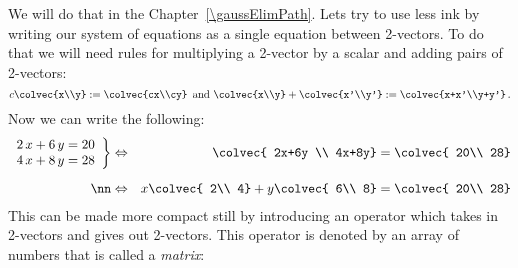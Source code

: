 %
We will do that in the Chapter~\ref{\gaussElimPath}. Lets try to use less ink by writing our system of  equations as a single equation between 2-vectors.
To do that we will need rules for multiplying a 2-vector by a scalar and adding pairs of 2-vectors:
$$
c\colvec{x\\y}:=\colvec{cx\\cy}\, \mbox{ and } \colvec{x\\y}+\colvec{x'\\y'}:=\colvec{x+x'\\y+y'}\, .
$$
Now we can write the following:
\begin{eqnarray*}
   \left.
\begin{array}{lr}
   	2\, x + 6\, y  =  20 \\
	4\, x + 8\, y  =  28
     \end{array}
   \right\} 
& \Leftrightarrow&    \colvec{ 2x+6y \\ 4x+8y}  =\colvec{ 20\\ 28}\\[2mm] \nn 
&\Leftrightarrow&
   x \colvec{ 2\\ 4} + y \colvec{ 6\\ 8} =\colvec{ 20\\ 28} 
\end{eqnarray*}
This can be made more compact still by introducing an operator which takes in 2-vectors and gives out 2-vectors. This operator is denoted by an array of numbers that  is called a {\it matrix}:
